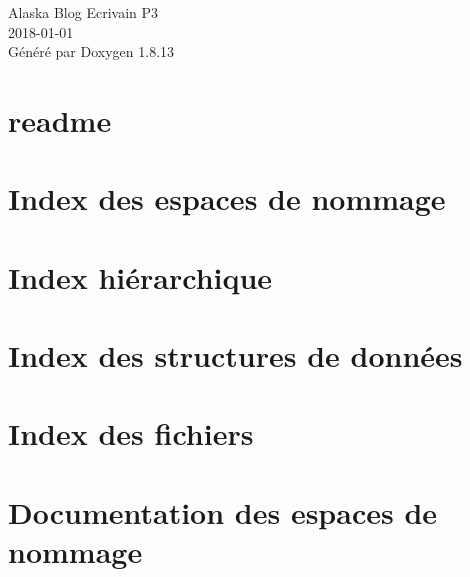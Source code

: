 \documentclass[twoside]{book}
\newcommand{\+}{\discretionary{\mbox{\scriptsize$\hookleftarrow$}}{}{}}
\newcommand{\clearemptydoublepage}{%
  \newpage{\pagestyle{empty}\cleardoublepage}%
}
\begin{document}
\hypersetup{pageanchor=false,
             bookmarksnumbered=true,
             pdfencoding=unicode
            }
\begin{titlepage}
\vspace*{7cm}
\begin{center}%
{\Large Alaska Blog Ecrivain P3 \\[1ex]\large 2018-\/01-\/01 }\\
\vspace*{1cm}
{\large Généré par Doxygen 1.8.13}\\
\end{center}
\end{titlepage}
\clearemptydoublepage
{}
\tableofcontents
\clearemptydoublepage
{}
\hypersetup{pageanchor=true}

\chapter{readme}
\label{md__var_www_html__alaska__web_js_tinymce_langs_readme}

\chapter{Index des espaces de nommage}

\chapter{Index hiérarchique}

\chapter{Index des structures de données}

\chapter{Index des fichiers}

\chapter{Documentation des espaces de nommage}






\end{document}

